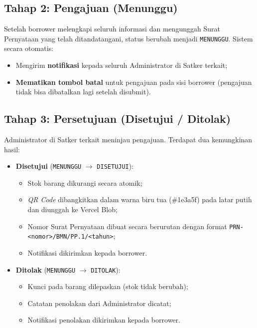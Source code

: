 \documentclass[
  12pt,
  a4paper,
  oneside,
  final
]{report}
\begin{document}
\subsection{Tahap 2: Pengajuan (Menunggu)}
Setelah borrower melengkapi seluruh informasi dan mengunggah
Surat Pernyataan yang telah ditandatangani, status berubah
menjadi \texttt{MENUNGGU}. Sistem secara otomatis:
\begin{itemize}
  \item Mengirim {\bfseries notifikasi} kepada seluruh Administrator
        di Satker terkait;
  \item {\bfseries Mematikan tombol batal} untuk pengajuan
        pada sisi borrower (pengajuan tidak bisa dibatalkan
        lagi setelah disubmit).
\end{itemize}

\subsection{Tahap 3: Persetujuan (Disetujui / Ditolak)}
Administrator di Satker terkait meninjau pengajuan. Terdapat
dua kemungkinan hasil:

\begin{itemize}
  \item {\bfseries Disetujui} (\texttt{MENUNGGU} $\rightarrow$
        \texttt{DISETUJUI}):
        \begin{itemize}
          \item Stok barang dikurangi secara atomik;
          \item {\it QR Code} dibangkitkan dalam warna biru tua
                (\#1e3a5f) pada latar putih dan diunggah ke Vercel Blob;
          \item Nomor Surat Pernyataan dibuat secara berurutan
                dengan format \texttt{PRN-<nomor>/BMN/PP.1/<tahun>};
          \item Notifikasi dikirimkan kepada borrower.
        \end{itemize}
  \item {\bfseries Ditolak} (\texttt{MENUNGGU} $\rightarrow$
        \texttt{DITOLAK}):
        \begin{itemize}
          \item Kunci pada barang dilepaskan (stok tidak berubah);
          \item Catatan penolakan dari Administrator dicatat;
          \item Notifikasi penolakan dikirimkan kepada borrower.
        \end{itemize}
\end{itemize}
\end{document}
